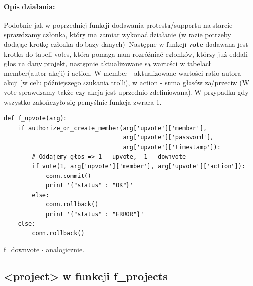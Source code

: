 \documentclass{article}
\begin{document}
\paragraph{Opis działania: }
Podobnie jak w poprzedniej funkcji dodawania protestu/supportu na starcie sprawdzamy członka, który ma zamiar wykonać działanie (w razie potrzeby dodając krotkę członka do bazy danych). \newline
Następne w funkcji \textbf{vote} dodawana jest krotka do tabeli votes, która pomaga nam rozróżniać członków, którzy już oddali głos na dany projekt, następnie aktualizowane są wartości w tabelach member(autor akcji) i action. W member - aktualizowane wartości ratio autora akcji (w celu późniejszego szukania trolli), w action - suma głosów za/przeciw (W vote sprawdzamy także czy akcja jest uprzednio zdefiniowana). W przypadku gdy wszystko zakończyło się pomyślnie funkcja zwraca 1.
\begin{verbatim}
def f_upvote(arg):
    if authorize_or_create_member(arg['upvote']['member'],
                                  arg['upvote']['password'], 
                                  arg['upvote']['timestamp']):
        # Oddajemy głos => 1 - upvote, -1 - downvote
        if vote(1, arg['upvote']['member'], arg['upvote']['action']):
            conn.commit()
            print '{"status" : "OK"}'
        else:
            conn.rollback()   
            print '{"status" : "ERROR"}'
    else:
        conn.rollback() 
\end{verbatim}
f\_downvote - analogicznie.








\newpage
\subsection{<project> w funkcji f\_projects }
\end{document}

